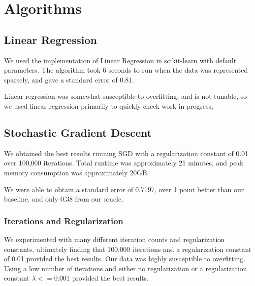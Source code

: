 \documentclass[journal]{IEEEtran}
\begin{document}
\section{Algorithms}

\subsection{Linear Regression}
We used the implementation of Linear Regression in scikit-learn with default
parameters. The algorithm took 6 seconds to run when the data was represented
sparsely, and gave a standard error of 0.81.
\\
\par Linear regression was somewhat susceptible to overfitting, and is not tunable, so we used
linear regression primarily to quickly check work in progress,

\subsection{Stochastic Gradient Descent}

We obtained the best results running SGD with a regularization constant of 0.01 over 100,000 iterations.  Total runtime was approximately 21 minutes, and peak memory consumption was approximately 20GB.
\\
\par We were able to obtain a standard error of 0.7197, over 1 point better than our baseline,
and only 0.38 from our oracle.
\\
\subsubsection{Iterations and Regularization}
We experimented with many different iteration counts and regularization constants, ultimately finding that 100,000 iterations and a regularization constant of 0.01 provided the best results.  Our data was highly susceptible to overfitting.  Using a low number of iterations and either no regularization or a regularization constant $ \lambda <= 0.001 $  provided the best results.
\end{document}
